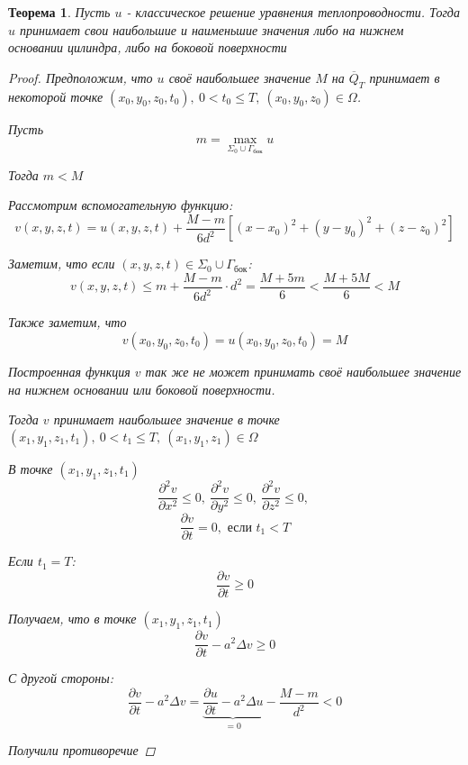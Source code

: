\documentclass[a4paper]{article}
\newtheorem*{theorem}{Теорема}
\theoremstyle{definition}
\theoremstyle{remark}
\begin{document}
\begin{tcolorbox}
    \begin{theorem}
        Пусть $ u $ - классическое решение уравнения теплопроводности. Тогда $ u $ принимает
        свои наибольшие и наименьшие значения либо на нижнем основании цилиндра, либо на
        боковой поверхности

        \begin{proof}
            Предположим, что $ u $ своё наибольшее значение $ M $ на $ \overline{Q}_T $ 
            принимает в некоторой точке $ (x_0, y_0, z_0, t_0), \  0 < t_0 \leq T,
            \ (x_0,y_0,z_0) \in \Omega$.

            Пусть
            \[
                m = \max_{\Sigma_0 \cup \Gamma_{\text{бок}}} u
            \]
            
            Тогда $ m < M $ 

            Рассмотрим вспомогательную функцию:
            \[
                v(x,y,z,t) = u(x,y,z,t) +  \frac{M - m}{6 d^2} [(x-x_0)^2 
                + (y-y_0)^2 + (z-z_0)^2]
            \]

            Заметим, что если $ (x,y,z,t) \in \Sigma_0 \cup \Gamma_{\text{бок}} $:
            \[
                v(x,y,z,t) \leq m + \frac{M - m}{6 d^2} \cdot d^2 = \frac{M+5m}{6} <
                \frac{M+5M}{6} < M
            \]
            
            Также заметим, что
            \[
                v(x_0, y_0, z_0, t_0) = u(x_0, y_0, z_0, t_0) = M
            \]

            Построенная функция $ v $ так же не может принимать своё наибольшее
            значение на нижнем основании или боковой поверхности.

            Тогда $ v $ принимает наибольшее значение в точке $ (x_1, y_1, z_1,t_1), \ 
            0 < t_1 \leq T, \ (x_1,y_1,z_1) \in \Omega$ 

            В точке $ (x_1, y_1, z_1,t_1) $
            \[
                \frac{\partial^2 v}{\partial x^2} \leq 0, \
                \frac{\partial^2 v}{\partial y^2} \leq 0, \
                \frac{\partial^2 v}{\partial z^2} \leq 0, \
            \]
            \[
                \frac{\partial v}{\partial t} = 0, \text{ если } t_1 < T
            \]

            Если $ t_1 = T $:
            \[
                \frac{\partial v}{\partial t} \geq 0
            \]

            Получаем, что в точке $ (x_1, y_1, z_1,t_1) $
            \[
                \frac{\partial v}{\partial t} - a^2 \Delta v \geq 0
            \]

            С другой стороны:
            \[
                \frac{\partial v}{\partial t} - a^2 \Delta v = \underbrace{
                \frac{\partial u}{\partial t} - a^2 \Delta u}_{=0} - \frac{M-m}{d^2} 
                < 0
            \]

            Получили противоречие
        \end{proof}
    \end{theorem}
\end{tcolorbox}
\end{document}
